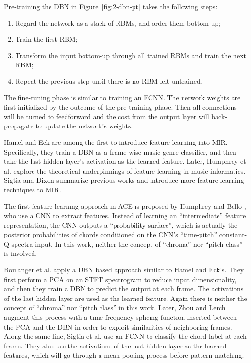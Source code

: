 \noindent
Pre-training the DBN in Figure~\ref{fig:2-dbn-pt} takes the following steps:
\begin{enumerate}
\item Regard the network as a stack of RBMs, and order them bottom-up;
\item Train the first RBM;
\item Transform the input bottom-up through all trained RBMs and train the next RBM;
\item Repeat the previous step until there is no RBM left untrained.
\end{enumerate}
The fine-tuning phase is similar to training an FCNN. The network weights are first initialized by the outcome of the pre-training phase. Then all connections will be turned to feedforward and the cost from the output layer will back-propagate to update the network's weights.

Hamel and Eck \cite{hamel2010learning} are among the first to introduce feature learning into MIR. Specifically, they train a DBN as a frame-wise music genre classifier, and then take the last hidden layer's activation as the learned feature. Later, Humphrey et al. \cite{humphrey2013feature} explore the theoretical underpinnings of feature learning in music informatics. Sigtia and Dixon \cite{sigtia2014improved} summarize previous works and introduce more feature learning techniques to MIR.

The first feature learning approach in ACE is proposed by Humphrey and Bello \cite{humphrey2012rethinking}, who use a CNN to extract features. Instead of learning an ``intermediate'' feature representation, the CNN outputs a ``probability surface'', which is actually the posterior probabilities of chords conditioned on the CNN's ``time-pitch'' constant-Q spectra input. In this work, neither the concept of ``chroma'' nor ``pitch class'' is involved. 

Boulanger et al. \cite{boulanger2013audio} apply a DBN based approach similar to Hamel and Eck's. They first perform a PCA on an STFT spectrogram to reduce input dimensionality, and then they train a DBN to predict the output at each frame. The activations of the last hidden layer are used as the learned feature. Again there is neither the concept of ``chroma'' nor ``pitch class'' in this work. Later, Zhou and Lerch \cite{zhou2015chord} augment this process with a time-frequency splicing function inserted between the PCA and the DBN in order to exploit similarities of neighboring frames. Along the same line, Sigtia et al. \cite{sigtia2015audio} use an FCNN to classify the chord label at each frame. They also use the activations of the last hidden layer as the learned features, which will go through a mean pooling process before pattern matching.

